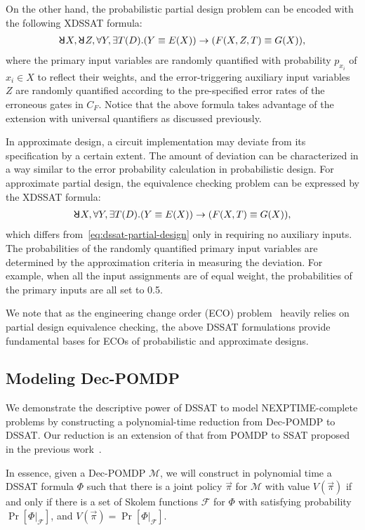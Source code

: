 On the other hand,
the probabilistic partial design problem can be encoded with the following XDSSAT formula:
\begin{align}
    \label{eq:dssat-partial-design}
    \random{} X,\random{} Z,\forall Y,\exists T(D).(Y \equiv E(X)) \limply (F(X,Z,T)\equiv G(X)),
\end{align}
where the primary input variables are randomly quantified with probability $p_{x_i}$ of $x_i \in X$ to reflect their weights,
and the error-triggering auxiliary input variables $Z$ are randomly quantified according to the pre-specified error rates of the erroneous gates in $C_F$.
Notice that the above formula takes advantage of the extension with universal quantifiers as discussed previously.

In approximate design,
a circuit implementation may deviate from its specification by a certain extent.
The amount of deviation can be characterized in a way similar to the error probability calculation in probabilistic design.
For approximate partial design,
the equivalence checking problem can be expressed by the XDSSAT formula:
\begin{align}
    \label{eq:dssat-approximate-design}
    \random{} X,\forall Y,\exists T(D).(Y \equiv E(X)) \limply (F(X,T)\equiv G(X)),
\end{align}
which differs from~\cref{eq:dssat-partial-design} only in requiring no auxiliary inputs.
The probabilities of the randomly quantified primary input variables are determined by the approximation criteria in measuring the deviation.
For example, when all the input assignments are of equal weight,
the probabilities of the primary inputs are all set to 0.5.

We note that as the engineering change order (ECO) problem~\cite{JiangDATE20ECOSurvey} heavily relies on partial design equivalence checking,
the above DSSAT formulations provide fundamental bases for ECOs of probabilistic and approximate designs.

\subsection{Modeling Dec-POMDP}

We demonstrate the descriptive power of DSSAT to model NEXPTIME-complete problems by constructing a polynomial-time reduction from Dec-POMDP to DSSAT.
Our reduction is an extension of that from POMDP to SSAT proposed in the previous work~\cite{Salmon2020}.

In essence, given a Dec-POMDP $\mathcal{M}$, we will construct in polynomial time a DSSAT formula $\Phi$ such that there is a joint policy $\vec{\pi}$ for $\mathcal{M}$ with value $V(\vec{\pi})$ if and only if there is a set of Skolem functions $\mathcal{F}$ for $\Phi$ with satisfying probability $\Pr[\Phi|_{\mathcal{F}}]$, and $V(\vec{\pi})=\Pr[\Phi|_{\mathcal{F}}]$.


